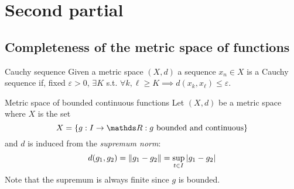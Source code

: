 \documentclass[12pt]{extarticle}
\numberwithin{equation}{section}
\begin{document}
\section{Second partial}

\subsection{Completeness of the metric space of functions}

\begin{definition}{Cauchy sequence}{}
	Given a metric space $(X, d)$ a sequence $x_n \in X$ is a Cauchy sequence if,
	fixed $\varepsilon > 0$,
	$\exists K$ s.t. $\forall k, \ell \geq K
		\implies d(x_k, x_\ell) \leq \varepsilon$.
\end{definition}

\begin{definition}{Metric space of bounded continuous functions}{}
	Let $(X, d)$ be a metric space where $X$ is the set
	\begin{equation}
		X = \{ g:I \to \R : g \text{ bounded and continuous} \}
	\end{equation}
	and $d$ is induced from the \emph{supremum norm}:
	\begin{equation}
		d(g_1, g_2) = \norm{g_1 - g_2} = \sup_{t \in I} \abs{g_1 - g_2}
	\end{equation}
	Note that the supremum is always finite since $g$ is bounded.
\end{definition}
\end{document}
